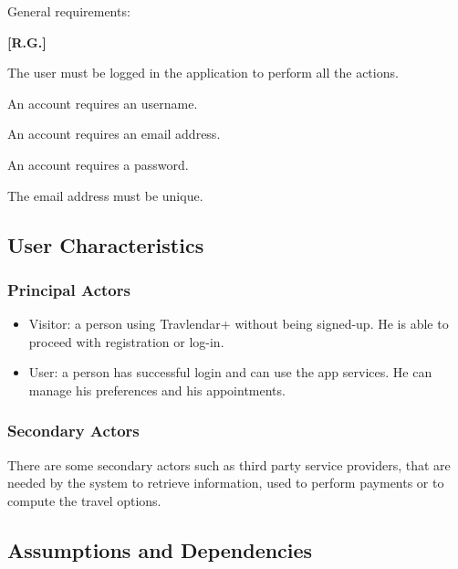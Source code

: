 General requirements:
\begin{list}
	{\bfseries{}[R.G.]~}
	{
	}
\item The user must be logged in the application to perform all the actions.
\item An account requires an username.
\item An account requires an email address.
\item An account requires a password.
\item The email address must be unique.
\end{list}

\subsection{User Characteristics}

\subsubsection{Principal Actors}

\renewcommand{\labelitemi}{$-$}
\begin{itemize}
\item
Visitor: a person using Travlendar+ without being signed-up. He is able to proceed with registration or log-in.
\item
User: a person has successful login and can use the app services. He can manage his preferences and his appointments.
\end{itemize}

\subsubsection{Secondary Actors}
There are some secondary actors such as third party service providers, that are needed by the system to retrieve information, used to perform payments or to compute the travel options. 

\subsection{Assumptions and Dependencies}
